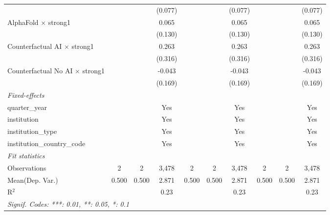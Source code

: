 \begin{tabular}{lccccccccc}
                                          &     &     & (0.077) &     &     & (0.077) &     &     & (0.077)\\   
   AlphaFold $\times$ strong1             &     &     & 0.065   &     &     & 0.065   &     &     & 0.065\\   
                                          &     &     & (0.130) &     &     & (0.130) &     &     & (0.130)\\   
   Counterfactual AI $\times$ strong1     &     &     & 0.263   &     &     & 0.263   &     &     & 0.263\\   
                                          &     &     & (0.316) &     &     & (0.316) &     &     & (0.316)\\   
   Counterfactual No AI $\times$ strong1  &     &     & -0.043  &     &     & -0.043  &     &     & -0.043\\   
                                          &     &     & (0.169) &     &     & (0.169) &     &     & (0.169)\\   
   \midrule
   \emph{Fixed-effects}\\
   quarter\_year                          &     &     & Yes     &     &     & Yes     &     &     & Yes\\  
   institution                            &     &     & Yes     &     &     & Yes     &     &     & Yes\\  
   institution\_type                      &     &     & Yes     &     &     & Yes     &     &     & Yes\\  
   institution\_country\_code             &     &     & Yes     &     &     & Yes     &     &     & Yes\\  
   \midrule
   \emph{Fit statistics}\\
   Observations                           & 2   & 2   & 3,478   & 2   & 2   & 3,478   & 2   & 2   & 3,478\\  
Mean(Dep. Var.) & 0.500 & 0.500 & 2.871 & 0.500 & 0.500 & 2.871 & 0.500 & 0.500 & 2.871 \\
   R$^2$                                  &     &     & 0.23    &     &     & 0.23    &     &     & 0.23\\  
   \midrule \midrule
   \multicolumn{10}{l}{\emph{Signif. Codes: ***: 0.01, **: 0.05, *: 0.1}}\\
\end{tabular}
\par\endgroup
